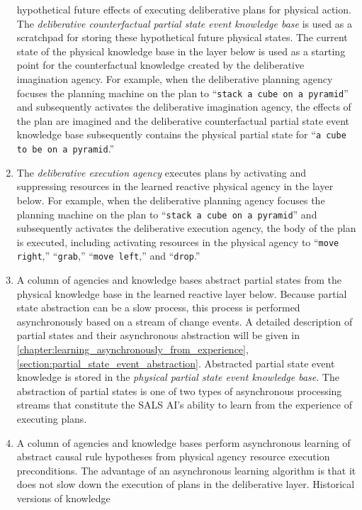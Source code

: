 \begin{enumerate}[~~A.]
  hypothetical future effects of executing deliberative plans for
  physical action.  The {\emph{deliberative counterfactual partial
      state event knowledge base}} is used as a scratchpad for storing
  these hypothetical future physical states.  The current state of the
  physical knowledge base in the layer below is used as a starting
  point for the counterfactual knowledge created by the deliberative
  imagination agency.  For example, when the deliberative planning
  agency focuses the planning machine on the plan to ``{\tt{stack a
      cube on a pyramid}}'' and subsequently activates the
  deliberative imagination agency, the effects of the plan are
  imagined and the deliberative counterfactual partial state event
  knowledge base subsequently contains the physical partial state for
  ``{\tt{a cube to be on a pyramid}}.''
\item The {\emph{deliberative execution agency}} executes plans by
  activating and suppressing resources in the learned reactive
  physical agency in the layer below.  For example, when the
  deliberative planning agency focuses the planning machine on the
  plan to ``{\tt{stack a cube on a pyramid}}'' and subsequently
  activates the deliberative execution agency, the body of the plan is
  executed, including activating resources in the physical agency to
  ``{\tt{move right}},'' ``{\tt{grab}},'' ``{\tt{move left}},'' and
  ``{\tt{drop}}.''
\item A column of agencies and knowledge bases abstract partial states
  from the physical knowledge base in the learned reactive layer
  below.  Because partial state abstraction can be a slow process,
  this process is performed asynchronously based on a stream of change
  events.  A detailed description of partial states and their
  asynchronous abstraction will be given in
  {\mbox{\autoref{chapter:learning_asynchronously_from_experience}}},
  {\mbox{\autoref{section:partial_state_event_abstraction}}}.
  Abstracted partial state event knowledge is stored in the
  {\emph{physical partial state event knowledge base}}.  The
  abstraction of partial states is one of two types of asynchronous
  processing streams that constitute the SALS AI's ability to learn
  from the experience of executing plans.
\item A column of agencies and knowledge bases perform asynchronous
  learning of abstract causal rule hypotheses from physical agency
  resource execution preconditions.  The advantage of an asynchronous
  learning algorithm is that it does not slow down the execution of
  plans in the deliberative layer.  Historical versions of knowledge

\end{enumerate}
